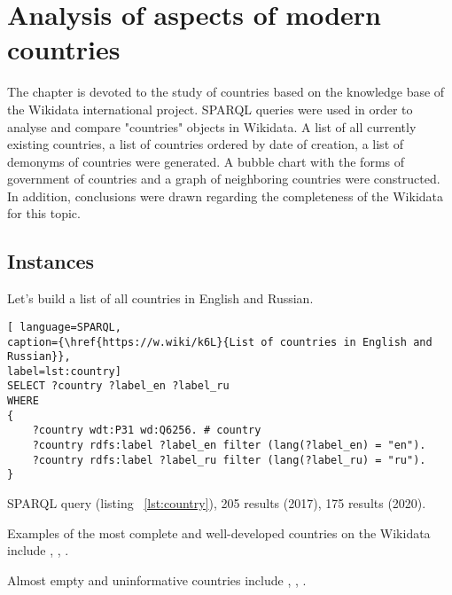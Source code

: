 \setchapterpreamble[u]{\margintoc}
\chapter{Analysis of aspects of modern countries\protect\footnotemark}


The chapter is devoted to the study of countries based on the knowledge base of the Wikidata international project. SPARQL queries were used in order to analyse and compare "countries" objects in Wikidata. A list of all currently existing countries, a list of countries ordered by date of creation, a list of demonyms of countries were generated. A bubble chart with the forms of government of countries and a graph of neighboring countries were constructed. In addition, conclusions were drawn regarding the completeness of the Wikidata for this topic.

\section{Instances}

Let's build a list of all countries in English and Russian.

\begin{lstlisting}[ language=SPARQL, 
caption={\href{https://w.wiki/k6L}{List of countries in English and Russian}},
label=lst:country]
SELECT ?country ?label_en ?label_ru
WHERE
{
	?country wdt:P31 wd:Q6256. # country
	?country rdfs:label ?label_en filter (lang(?label_en) = "en").
	?country rdfs:label ?label_ru filter (lang(?label_ru) = "ru").
}
\end{lstlisting}

SPARQL query (listing ~\ref{lst:country}), 205 results (2017), 175 results (2020).

Examples of the most complete and well-developed countries on the Wikidata include , , .

Almost empty and uninformative countries include , , .


